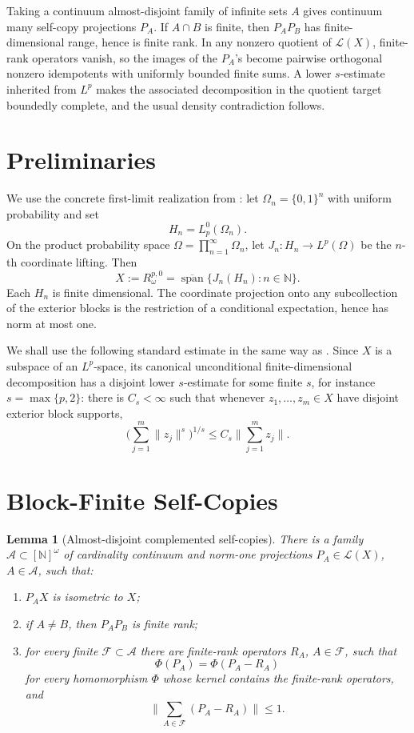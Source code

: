\documentclass[11pt]{article}
\newtheorem{lemma}{Lemma}
\newcommand{\Lop}{\mathcal L}
\newcommand{\N}{\mathbb N}
\begin{document}
Taking a continuum almost-disjoint family of infinite sets \(A\) gives
continuum many self-copy projections \(P_A\).  If \(A\cap B\) is finite, then
\(P_AP_B\) has finite-dimensional range, hence is finite rank.  In any
nonzero quotient of \(\Lop(X)\), finite-rank operators vanish, so the images of
the \(P_A\)'s become pairwise orthogonal nonzero idempotents with uniformly
bounded finite sums.  A lower \(s\)-estimate inherited from \(L^p\) makes the
associated decomposition in the quotient target boundedly complete, and the
usual density contradiction follows.

\section*{Preliminaries}

We use the concrete first-limit realization from \cite{Sampedro}: let
\(\Omega_n=\{0,1\}^n\) with uniform probability and set
\[
  H_n=L_p^0(\Omega_n).
\]
On the product probability space \(\Omega=\prod_{n=1}^\infty \Omega_n\), let
\(J_n:H_n\to L^p(\Omega)\) be the \(n\)-th coordinate lifting.  Then
\[
  X:=R_\omega^{p,0}
     = \overline{\operatorname{span}}\{J_n(H_n):n\in\N\}.
\]
Each \(H_n\) is finite dimensional.  The coordinate projection onto any
subcollection of the exterior blocks is the restriction of a conditional
expectation, hence has norm at most one.

We shall use the following standard estimate in the same way as
\cite[Section 1]{JPS}.  Since \(X\) is a subspace of an \(L^p\)-space, its
canonical unconditional finite-dimensional decomposition has a disjoint lower
\(s\)-estimate for some finite \(s\), for instance \(s=\max\{p,2\}\): there is
\(C_s<\infty\) such that whenever \(z_1,\ldots,z_m\in X\) have disjoint
exterior block supports,
\[
  \Big(\sum_{j=1}^m \|z_j\|^s\Big)^{1/s}
     \le C_s\Big\|\sum_{j=1}^m z_j\Big\|.
\]

\section*{Block-Finite Self-Copies}

\begin{lemma}[Almost-disjoint complemented self-copies]
\label{copy-lemma}
There is a family \(\mathcal A\subset[\N]^\omega\) of cardinality continuum and
norm-one projections \(P_A\in\Lop(X)\), \(A\in\mathcal A\), such that:
\begin{enumerate}
\item \(P_A X\) is isometric to \(X\);
\item if \(A\ne B\), then \(P_AP_B\) is finite rank;
\item for every finite \(\mathcal F\subset\mathcal A\) there are finite-rank
operators \(R_A\), \(A\in\mathcal F\), such that
\[
  \Phi(P_A)=\Phi(P_A-R_A)
\]
for every homomorphism \(\Phi\) whose kernel contains the finite-rank
operators, and
\[
  \Big\|\sum_{A\in\mathcal F}(P_A-R_A)\Big\|\le 1.
\]
\end{enumerate}
\end{lemma}
\end{document}
